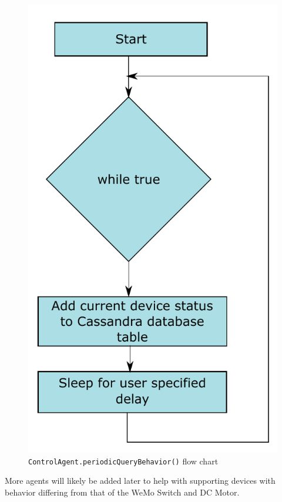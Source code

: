 \documentclass[letterpaper,12pt]{article}   %
\begin{document}
\begin{figure}[H]
    \centering
    \includegraphics[scale=0.45]{figs/agents/periodicQueryBehaviorFlow.pdf}
    \caption{\texttt{ControlAgent.periodicQueryBehavior()} flow chart}
    \label{fig:periodicQueryBehavior}
\end{figure}

More agents will likely be added later to help with supporting devices with behavior differing from that of the WeMo Switch and DC Motor. 
\end{document}
